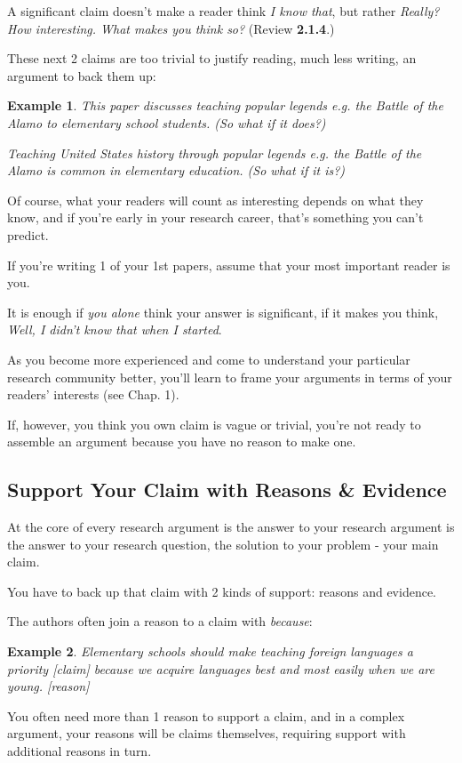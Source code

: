 \documentclass[oneside]{book}
\numberwithin{equation}{section}
\newtheorem{example}{Example}[section]
\begin{document}
A significant claim doesn't make a reader think \textit{I know that}, but rather \textit{Really? How interesting. What makes you think so?} (Review \textbf{2.1.4}.)

These next 2 claims are too trivial to justify reading, much less writing, an argument to back them up:
\begin{example}
    This paper discusses teaching popular legends e.g. the Battle of the Alamo to elementary school students. \emph{(So what if it does?)}
    
    Teaching United States history through popular legends e.g. the Battle of the Alamo is common in elementary education. \emph{(So what if it is?)}
\end{example}
Of course, what your readers will count as interesting depends on what they know, and if you're early in your research career, that's something you can't predict.

If you're writing 1 of your 1st papers, assume that your most important reader is you.

It is enough if \textit{you alone} think your answer is significant, if it makes you think, \textit{Well, I didn't know that when I started}.

As you become more experienced and come to understand your particular research community better, you'll learn to frame your arguments in terms of your readers' interests (see Chap. 1).

If, however, you think you own claim is vague or trivial, you're not ready to assemble an argument because you have no reason to make one.

\subsection{Support Your Claim with Reasons \& Evidence}
At the core of every research argument is the answer to your research argument is the answer to your research question, the solution to your problem - your main claim.

You have to back up that claim with 2 kinds of support: reasons and evidence.

%

The authors often join a reason to a claim with \textit{because}:
\begin{example}
    Elementary schools should make teaching foreign languages a priority [claim] because we acquire languages best and most easily when we are young. [reason]
\end{example}
You often need more than 1 reason to support a claim, and in a complex argument, your reasons will be claims themselves, requiring support with additional reasons in turn.
\end{document}

